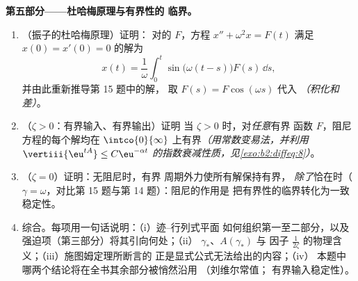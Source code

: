 \begin{problem}
\medskip
\noindent\textbf{第五部分——杜哈梅原理与有界性的
临界。}
\begin{enumerate}[resume]
  \item （振子的杜哈梅原理）证明：
        对的 $F$，方程 $x'' + \omega^2x =
        F(t)$ 满足 $x(0) = x'(0) = 0$ 的解为
        \[
        x(t) = \frac1\omega\int_0^t\sin\bigl(\omega(t -
        s)\bigr)F(s)\,\dd s ,
        \]
        并由此重新推导第 15 题中的解，
        取 $F(s) = F\cos(\omega s)$ 代入
        \emph{（积化和差）}。
  \item （$\zeta > 0$：有界输入、有界输出）证明
        当 $\zeta > 0$ 时，对\emph{任意}有界
        函数 $F$，阻尼方程的每个解均在
        $\intco{0}{\infty}$ 上有界\emph{（用常数变易法，并利用
        $\vertiii{\eu^{tA}} \leq
        C\eu^{-\alpha t}$ 的指数衰减性质，见\cref{exo:b2:diffeq:8}）}。
  \item （$\zeta = 0$）证明：无阻尼时，有界
        周期外力使所有解保持有界，
        \emph{除了}恰在时（$\gamma =
        \omega$，对比第 15 题与第 14 题）：阻尼的作用是
        把有界性的临界转化为一致
        稳定性。
  \item 综合。每项用一句话说明：（i）迹--行列式平面
        如何组织第一至二部分，以及
        强迫项（第三部分）将其引向何处；（ii）
        $\gamma_*$、$A(\gamma_*)$ 与
        因子 $\frac1{2\zeta}$ 的物理含义；（iii）施图姆定理所断言的
        正是显式公式无法给出的内容；（iv）
        本题中哪两个结论将在全书其余部分被悄然沿用
        （刘维尔常值；
        有界输入稳定性）。
\end{enumerate}
\end{problem}
